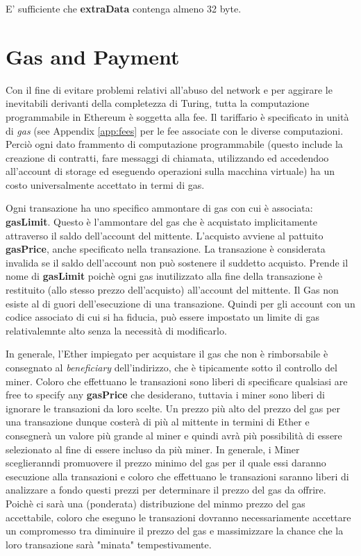 \documentclass[9pt,oneside]{amsart}
\begin{document}
\begin{multicols}{2}
E' sufficiente che \textbf{extraData} contenga almeno 32 byte.

\section{Gas and Payment} \label{ch:payment}

Con il fine di evitare problemi relativi all'abuso del network e per aggirare le inevitabili derivanti della completezza di Turing, tutta la computazione programmabile in Ethereum è soggetta alla fee. Il tariffario è specificato in unità di \textit{gas} (see Appendix \ref{app:fees} per le fee associate con le diverse computazioni. Perciò ogni dato frammento di computazione programmabile (questo include la creazione di contratti, fare messaggi di chiamata, utilizzando ed accedendoo all'account di storage ed eseguendo operazioni sulla macchina virtuale) ha un costo universalmente accettato in termi di gas.

Ogni transazione ha uno specifico ammontare di gas con cui è associata: \textbf{gasLimit}. Questo è l'ammontare del gas che è acquistato implicitamente attraverso il saldo dell'account del mittente. L'acquisto avviene al pattuito \textbf{gasPrice}, anche specificato nella transazione. La transazione è considerata invalida se il saldo dell'account non può sostenere il suddetto acquisto. Prende il nome di \textbf{gasLimit} poichè ogni gas inutilizzato alla fine della transazione è restituito (allo stesso prezzo dell'acquisto) all'account del mittente. Il Gas non esiste al di guori dell'esecuzione di una transazione. Quindi per gli account con un codice associato di cui si ha fiducia, può essere impostato un limite di gas relativalemnte alto senza la necessità di modificarlo.

In generale, l'Ether impiegato per acquistare il gas che non è rimborsabile è consegnato al \textit{beneficiary} dell'indirizzo, che è tipicamente sotto il controllo del miner. Coloro che effettuano le transazioni sono liberi di specificare qualsiasi are free to specify any \textbf{gasPrice} che desiderano, tuttavia i miner sono liberi di ignorare le transazioni da loro scelte. Un prezzo più alto del prezzo del gas per una transazione dunque costerà di più al mittente in termini di Ether e consegnerà un valore più grande al miner e quindi avrà più possibilità di essere selezionato al fine di essere incluso da più miner. In generale, i Miner sceglieranndi promuovere il prezzo minimo del gas per il quale essi daranno esecuzione alla transazioni e coloro che effettuano le transazioni saranno liberi di analizzare a fondo questi prezzi per determinare il prezzo del gas da offrire. Poichè ci sarà una (ponderata) distribuzione del minmo prezzo del gas accettabile, coloro che eseguno le transazioni dovranno necessariamente accettare un compromesso tra diminuire il prezzo del gas e massimizzare la chance che la loro transazione sarà "minata" tempestivamente.


\end{multicols}
\end{document}
